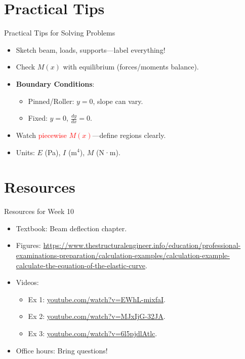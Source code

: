 \documentclass{beamer}
\begin{document}
\section{Practical Tips}
\begin{frame}{Practical Tips for Solving Problems}
    \begin{itemize}
        \item Sketch beam, loads, supports—label everything!
        \item Check \( M(x) \) with equilibrium (forces/moments balance).
        \item \textbf{Boundary Conditions}:
        \begin{itemize}
            \item Pinned/Roller: \( y = 0 \), slope can vary.
            \item Fixed: \( y = 0 \), \( \frac{dy}{dx} = 0 \).
        \end{itemize}
        \item Watch \textcolor{red}{piecewise \( M(x) \)}—define regions clearly.
        \item Units: \( E \) (Pa), \( I \) (m\(^4\)), \( M \) (N·m).
    \end{itemize}
\end{frame}

\section{Resources}
\begin{frame}{Resources for Week 10}
    \begin{itemize}
        \item Textbook: Beam deflection chapter.
        \item Figures: \url{https://www.thestructuralengineer.info/education/professional-examinations-preparation/calculation-examples/calculation-example-calculate-the-equation-of-the-elastic-curve}.
        \item Videos:
        \begin{itemize}
            \item Ex 1: \href{https://www.youtube.com/watch?v=EWhL-mixfaI}{youtube.com/watch?v=EWhL-mixfaI}.
            \item Ex 2: \href{https://www.youtube.com/watch?v=MJxIjG-32JA}{youtube.com/watch?v=MJxIjG-32JA}.
            \item Ex 3: \href{https://www.youtube.com/watch?v=6l5pjdlAtlc}{youtube.com/watch?v=6l5pjdlAtlc}.
        \end{itemize}
        \item Office hours: Bring questions!
    \end{itemize}
\end{frame}
\end{document}
